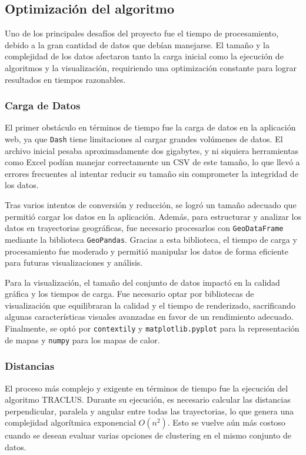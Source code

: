 \subsection{Optimización del algoritmo}

Uno de los principales desafíos del proyecto fue el tiempo de procesamiento, debido a la gran cantidad de datos que debían manejarse. El tamaño y la complejidad de los datos afectaron tanto la carga inicial como la ejecución de algoritmos y la visualización, requiriendo una optimización constante para lograr resultados en tiempos razonables.

\subsubsection{Carga de Datos}

El primer obstáculo en términos de tiempo fue la carga de datos en la aplicación web, ya que \texttt{Dash} tiene limitaciones al cargar grandes volúmenes de datos. El archivo inicial pesaba aproximadamente dos gigabytes, y ni siquiera herramientas como Excel podían manejar correctamente un CSV de este tamaño, lo que llevó a errores frecuentes al intentar reducir su tamaño sin comprometer la integridad de los datos.

Tras varios intentos de conversión y reducción, se logró un tamaño adecuado que permitió cargar los datos en la aplicación. Además, para estructurar y analizar los datos en trayectorias geográficas, fue necesario procesarlos con \texttt{GeoDataFrame} mediante la biblioteca \texttt{GeoPandas}. Gracias a esta biblioteca, el tiempo de carga y procesamiento fue moderado y permitió manipular los datos de forma eficiente para futuras visualizaciones y análisis.

Para la visualización, el tamaño del conjunto de datos impactó en la calidad gráfica y los tiempos de carga. Fue necesario optar por bibliotecas de visualización que equilibraran la calidad y el tiempo de renderizado, sacrificando algunas características visuales avanzadas en favor de un rendimiento adecuado. Finalmente, se optó por \texttt{contextily} y \texttt{matplotlib.pyplot} para la representación de mapas y \texttt{numpy} para los mapas de calor.

\subsubsection{Distancias}

El proceso más complejo y exigente en términos de tiempo fue la ejecución del algoritmo TRACLUS. Durante su ejecución, es necesario calcular las distancias perpendicular, paralela y angular entre todas las trayectorias, lo que genera una complejidad algorítmica exponencial \(O(n^2)\). Esto se vuelve aún más costoso cuando se desean evaluar varias opciones de clustering en el mismo conjunto de datos.

